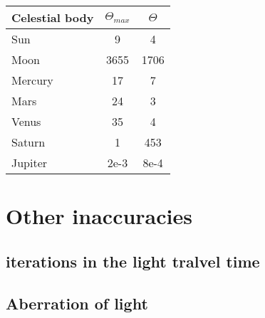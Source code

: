\documentclass[%
a4paper,%
pagesize,%
12pt,%
parskip=off,%
bibliography=totoc,%
numbers=noenddot,%
DIV=12,%
twoside=semi,%
headings=small,%
]{scrbook}
\let\mychapter\chapter
\let\mysection\section
\begin{document}
\begin{center}
\begin{tabular}{|l|S|S|}
\hline
\textbf{Celestial body} &  &   \\\hline
Sun & 9 & 4\\\hline %
Moon & 3655 & 1706\\\hline %
Mercury & 17 & 7\\\hline %
Mars & 24 & 3\\\hline %
Venus & 35 & 4\\\hline %
Saturn & 1 & 453\\\hline %
Jupiter & 2e-3 & 8e-4 \\\hline %
\end{tabular}
\end{center}

\mychapter{Other inaccuracies}

\mysection{iterations in the light tralvel time}

\mysection{Aberration of light}
\end{document}
